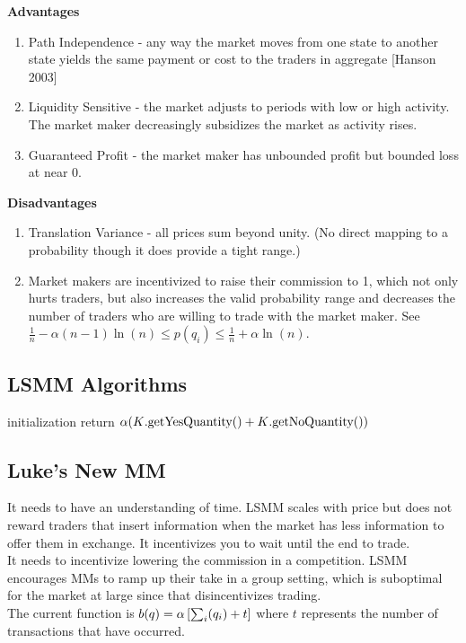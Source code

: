 \textbf{Advantages}\\
\begin{enumerate}
\item{Path Independence - any way the market moves from one state to another state yields the same payment or cost to the traders in aggregate [Hanson 2003]}
\item{Liquidity Sensitive - the market adjusts to periods with low or high activity. The market maker decreasingly subsidizes the market as activity rises.}
\item{Guaranteed Profit - the market maker has unbounded profit but bounded
loss at near 0.}
\end{enumerate}

\textbf{Disadvantages} \\
\begin{enumerate}
\item{Translation Variance - all prices sum beyond unity. (No direct mapping to a probability though it does provide a tight range.)}
\item Market makers are incentivized to raise their commission to 1, which not only hurts traders, but also increases the valid probability range
and decreases the number of traders who are willing to trade with the market maker. See $\frac{1}{n} - \alpha(n - 1)\ln(n) \leq p(q_i) \leq \frac{1}{n} + \alpha\ln(n)$.
\end{enumerate}

\subsection{LSMM Algorithms}
\begin{algorithm}[H]
\SetAlgoLined
{}
initialization\;
return $\alpha (K\text{.getYesQuantity()} + K\text{.getNoQuantity()})$\;
\end{algorithm}

\subsection{Luke's New MM}

It needs to have an understanding of time. LSMM scales with price but does not reward traders that insert information when the market has less information to offer them in exchange. It incentivizes you to wait until the
end to trade. \\

It needs to incentivize lowering the commission in a competition. LSMM 
encourages MMs to ramp up their take in a group setting, which is
suboptimal for the market at large since that disincentivizes trading. \\

The current function is $b(q) = \alpha \left[\sum_{i}(q_i) + t \right]$ where $t$ represents the number of transactions that have occurred.
